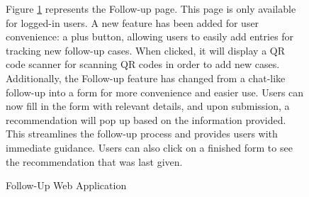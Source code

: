 \documentclass[12pt,oneside,openright,a4paper]{cpe-english-project}
\begin{document}
\begin{figure}[H]
            \caption{Follow-Up Web Application}\label{fig:WebAppFollowUp}
            \begin{justify}
              \qquad Figure \ref{fig:WebAppFollowUp} represents the Follow-up page. This page is only available for logged-in users. A new feature has been added for user convenience: a plus button, allowing users to easily add entries for tracking new follow-up cases. When clicked, it will display a QR code scanner for scanning QR codes in order to add new cases. Additionally, the Follow-up feature has changed from a chat-like follow-up into a form for more convenience and easier use. Users can now fill in the form with relevant details, and upon submission, a recommendation will pop up based on the information provided. This streamlines the follow-up process and provides users with immediate guidance. Users can also click on a finished form to see the recommendation that was last given.\par
            \end{justify}        
          \end{figure}
\end{document}
